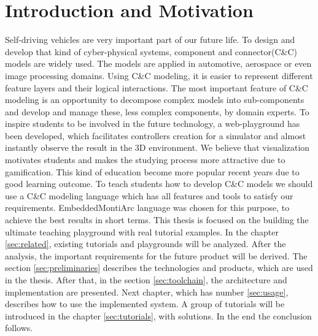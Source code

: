 \setlength{\parindent}{3ex}
\setlength{\parskip}{0ex}

\chapter{Introduction and Motivation}
Self-driving vehicles are very important part of our future life. To design and develop that kind of cyber-physical systems, component and connector(C\&C) models are widely used. The models are applied in automotive, aerospace or even image processing domains. Using C\&C modeling, it is easier to represent different feature layers and their logical interactions. The most important feature of C\&C modeling is an opportunity to decompose complex models into sub-components and develop and manage these, less complex components, by domain experts.\newline
To inspire students to be involved in the future technology, a web-playground has been developed, which facilitates controllers creation for a simulator and almost instantly observe the result in the 3D environment. We believe that visualization motivates students and makes the studying process more attractive due to gamification. This kind of education become more popular recent years due to good learning outcome\cite{Game}.\newline
To teach students how to develop C\&C models we should use a C\&C modeling language which has all features and tools to satisfy our requirements. EmbeddedMontiArc \cite{Mon10} language was chosen for this purpose, to achieve the best results in short terms.\newline
This thesis is focused on the building the ultimate teaching playground with real tutorial examples. In the chapter \ref{sec:related}, existing tutorials and playgrounds will be analyzed. After the analysis, the important requirements for the future product will be derived. The section \ref{sec:preliminaries} describes the technologies and products, which are used in the thesis. After that, in the section \ref{sec:toolchain}, the architecture and implementation are presented. Next chapter, which has number \ref{sec:usage}, describes how to use the implemented system. A group of tutorials will be introduced in the chapter \ref{sec:tutorials}, with solutions. In the end the conclusion follows.
\cleardoublepage

